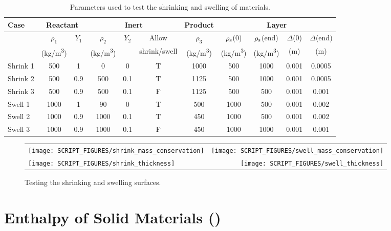 \documentclass[11pt]{book}
\begin{document}
\begin{table}[!htb]
\centering
\caption[Parameters for shrinking and swelling of materials]{Parameters used to test the shrinking and swelling of materials.}
\label{shrink_swell_table}
\begin{tabular}{|l|c|c|c|c|c|c|c|c|c|c|}
\hline
Case     & \multicolumn{2}{|c|}{Reactant}  &  \multicolumn{3}{|c|}{Inert} & Product & \multicolumn{4}{|c|}{Layer} \\ \hline
         & $\rho_1$  & $Y_1$ & $\rho_2$  & $Y_2$ & Allow        & $\rho_3$  & $\rho_{\rm s}$(0) & $\rho_{\rm s}$(end) & $\Delta$(0) & $\Delta$(end) \\
         & (\si{kg/m^3})&       & (\si{kg/m^3})&       & shrink/swell & (\si{kg/m^3})& (\si{kg/m^3})  & (\si{kg/m^3})    & (m)         & (m) \\ \hline

Shrink 1 & 500 & 1   & 0   & 0   & T   & 1000   & 500 & 1000   & 0.001  & 0.0005 \\
Shrink 2 & 500 &0.9  &500  &0.1  &T &1125 &500  &1000 &0.001   &0.0005 \\
Shrink 3 & 500 &0.9  &500  &0.1  &F &1125 &500  &500  &0.001   &0.001 \\
Swell 1          & 1000 &1 &90   &0 &T &500  &1000 &500  &0.001   &0.002 \\
Swell 2          & 1000 &0.9  &1000 &0.1  &T &450  &1000 &500  &0.001   &0.002 \\
Swell 3          & 1000 &0.9  &1000 &0.1  &F &450  &1000 &1000 &0.001   &0.001 \\ \hline
\end{tabular}
\end{table}

\begin{figure}[!htb]
\noindent
\begin{tabular*}{\textwidth}{l@{\extracolsep{\fill}}r}
\texttt{[image: SCRIPT\_FIGURES/shrink\_mass\_conservation]} &
\texttt{[image: SCRIPT\_FIGURES/swell\_mass\_conservation]} \\
\texttt{[image: SCRIPT\_FIGURES/shrink\_thickness]} &
\texttt{[image: SCRIPT\_FIGURES/swell\_thickness]} \\
\end{tabular*}
\caption[The  test case]{Testing the shrinking and swelling surfaces.}
\label{shrink_swell2}
\end{figure}



\section{Enthalpy of Solid Materials (\texorpdfstring{}{enthalpy})}
\label{enthalpy}
\end{document}
